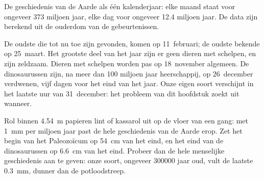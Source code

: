 \begin{omfigure}

{\small De geschiedenis van de Aarde als één kalenderjaar: elke maand staat
voor ongeveer \num{373} miljoen jaar, elke dag voor ongeveer \num{12.4}
miljoen jaar. De data zijn berekend uit de ouderdom van de gebeurtenissen.}
\label{fig:g7:geological-time:calendar}
\end{omfigure}

De oudste  die tot nu toe zijn gevonden, komen op 11~februari; de
oudste bekende  op 25~maart. Het grootste deel van het jaar zijn er
geen dieren met schelpen, en  zijn zeldzaam. Dieren met schelpen
worden pas op 18~november algemeen. De dinosaurussen zijn, na meer dan
\num{100} miljoen jaar heerschappij, op 26~december verdwenen, vijf dagen
voor het eind van het jaar. Onze eigen soort verschijnt in het laatste uur
van 31~december: het probleem van dit hoofdstuk zoekt uit wanneer.

\begin{inthelab}
Rol binnen \qty{4.54}{m} papieren lint of kassarol uit op de vloer van een
gang: met \qty{1}{mm} per miljoen jaar past de hele geschiedenis van de
Aarde erop. Zet het begin van het Paleozoïcum op \qty{54}{cm} van het eind,
en het eind van de dinosaurussen op \qty{6.6}{cm} van het eind. Probeer dan
de hele menselijke geschiedenis aan te geven: onze soort, ongeveer
\num{300000} jaar oud, vult de laatste \qty{0.3}{mm}, dunner dan de
potloodstreep.
\end{inthelab}


